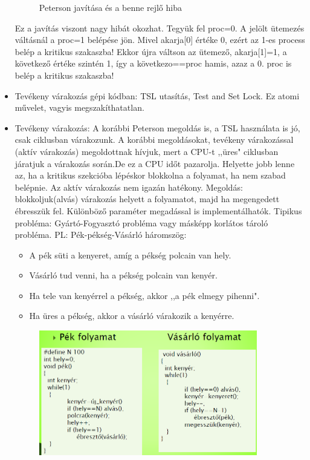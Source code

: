 \documentclass[margin=0px]{article}
\begin{document}
\begin{itemize}
\begin{figure}[H]
			\caption{Peterson javítása és a benne rejlő hiba}
		\end{figure}
		Ez a javítás viszont nagy hibát okozhat. Tegyük fel proc=0. A jelölt ütemezés váltásnál a proc=1 belépése jön. Mivel akarja[0] értéke 0, ezért az 1-es process belép a kritikus szakaszba! Ekkor újra váltson az ütemező, akarja[1]=1, a következő értéke szintén 1, így a következo==proc hamis, azaz a 0. proc is belép a kritikus szakaszba!
		\item Tevékeny várakozás gépi kódban: TSL utasítás, Test and Set Lock. Ez atomi művelet, vagyis megszakíthatatlan.
		\item Tevékeny várakozás: A korábbi Peterson megoldás is, a TSL használata is jó, csak ciklusban várakozunk. A korábbi megoldásokat, tevékeny várakozással (aktív várakozás) megoldottnak hívjuk, mert a CPU-t ,,üres" ciklusban járatjuk a várakozás során.De ez a CPU időt pazarolja. Helyette jobb lenne az, ha a kritikus szekcióba lépéskor blokkolna a folyamat, ha nem szabad belépnie. Az aktív várakozás nem igazán hatékony. Megoldás: blokkoljuk(alvás) várakozás helyett a folyamatot, majd ha megengedett ébresszük fel. Különböző paraméter megadással is implementálhatók. Tipikus probléma: Gyártó-Fogyasztó probléma vagy másképp korlátos tároló probléma. PL: Pék-pékség-Vásárló háromszög:
		\begin{itemize}
			\item A pék süti a kenyeret, amíg a pékség polcain van hely.
			\item Vásárló tud venni, ha a pékség polcain van kenyér.
			\item Ha tele van kenyérrel a pékség, akkor ,,a pék elmegy pihenni".
			\item Ha üres a pékség, akkor a vásárló várakozik a kenyérre.
		\end{itemize}
		\begin{figure}[H]
			\centering
			\includegraphics[width=0.9\textwidth]{img/pekvasarlo.png}

\end{figure}
\end{itemize}
\end{document}
